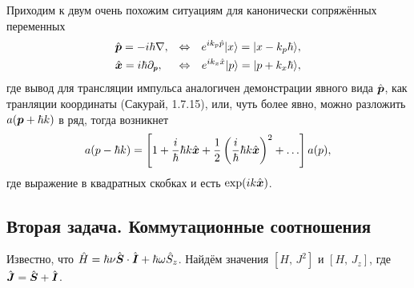 Приходим к двум очень похожим ситуациям для канонически сопряжённых переменных
\begin{align*}
    &\hat{\vc{p}} = - i \hbar \nabla,
    &\Leftrightarrow
    &&e^{i k_p \hat{p}} \ket{x} = \ket{x - k_p \hbar}, 
    \\
    &\hat{\vc{x}} = i \hbar \partial_{\smallvc{p}},
    &\Leftrightarrow
    &&e^{i k_x \hat{x}} \ket{p} = \ket{p + k_x \hbar},
\end{align*}
где вывод для трансляции импульса аналогичен демонстрации явного вида $\hat{\mbox{\boldmath $p$}}$, как транляции координаты (Сакурай, 1.7.15), или, чуть более явно, можно разложить $a(\mbox{\boldmath $p$} + \hbar k)$ в ряд, тогда возникнет 
\begin{equation*}
    a(p - \hbar k) = \left[
        1 + \frac{i}{\hbar} \hbar k \hat{\mbox{\boldmath $x$}} + \frac{1}{2} \left(
            \frac{i}{\hbar} \hbar k \hat{\mbox{\boldmath $x$}}
        \right)^2 + \ldots
    \right] a(p),
\end{equation*}
где выражение в квадратных скобках и есть $\exp(i k \hat{\mbox{\boldmath $x$}})$.





\subsection*{Вторая задача. Коммутационные соотношения}

Известно, что $\hat{H} = \hbar \nu \hat{\mbox{\boldmath $S$}} \cdot \hat{\mbox{\boldmath $I$}} + \hbar \omega \hat{S}_z$. Найдём значения $[H,\,  J^2]$ и $[H,\, J_z]$, где $\hat{\mbox{\boldmath $J$}} = \hat{\mbox{\boldmath $S$}} + \hat{\mbox{\boldmath $I$}}$. 

